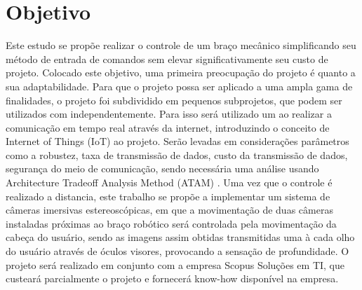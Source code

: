 
\setlength{\absparsep}{18pt} %
\chapter{Objetivo}\label{cap-objetivo}

Este estudo se propõe realizar o controle de um braço mecânico simplificando seu método de entrada de comandos sem elevar significativamente seu custo de projeto.
Colocado este objetivo, uma primeira preocupação do projeto é quanto a sua adaptabilidade. Para que o projeto possa ser aplicado a uma ampla gama de finalidades, o projeto foi subdividido em pequenos subprojetos, que podem ser utilizados com independentemente. Para isso será utilizado um ao realizar a comunicação em tempo real através da internet, introduzindo o conceito de Internet of  Things (IoT) ao projeto. 
Serão levadas em considerações parâmetros como a robustez, taxa de transmissão de dados, custo da transmissão de dados, segurança do meio de comunicação, sendo necessária uma análise usando Architecture Tradeoff Analysis Method (ATAM) .
Uma vez que o controle é realizado a distancia, este trabalho se propõe a implementar um sistema de câmeras imersivas estereoscópicas, em que a movimentação de duas câmeras instaladas próximas ao braço robótico será controlada pela movimentação da cabeça do usuário, sendo as imagens assim obtidas transmitidas uma à cada olho do usuário através de óculos visores, provocando a sensação de profundidade.
O projeto será realizado em conjunto com a empresa Scopus Soluções em TI, que custeará parcialmente o projeto e fornecerá  know-how disponível na empresa.